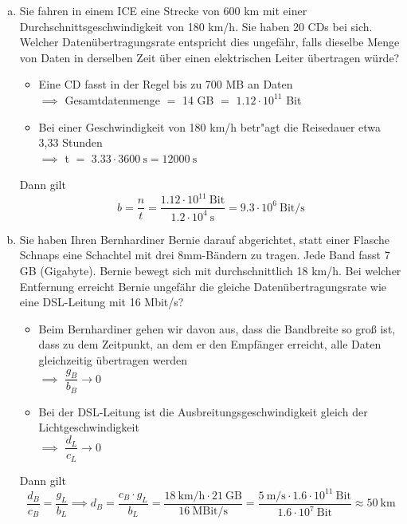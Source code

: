 \begin{enumerate}[(a)]
    \item Sie fahren in einem ICE eine Strecke von 600 km mit einer
        Durchschnittsgeschwindigkeit von 180 km/h. Sie haben 20 CDs bei sich.
        Welcher Datenübertragungsrate entspricht dies ungefähr, falls dieselbe
        Menge von Daten in derselben Zeit über einen elektrischen Leiter
        übertragen würde?
        \begin{itemize}
            \item Eine CD fasst in der Regel bis zu 700 MB an Daten \\
                \tabto{6mm} $\implies$ Gesamtdatenmenge $=$ 14 GB $=$ $1.12 \cdot 10^{11}$ Bit
            \item Bei einer Geschwindigkeit von 180 km/h betr"agt die Reisedauer etwa 3,33 Stunden\\
                \tabto{6mm} $\implies$ t $=$ $3.33 \cdot 3600\ \text{s} = 12000\ \text{s}$
        \end{itemize}
        Dann gilt
        \begin{equation*}
            b = \dfrac{n}{t} = \dfrac{1.12 \cdot 10^{11}\ \text{Bit}}{1.2 \cdot 10^4\ \text{s}} =
                9.3 \cdot 10^6\ \text{Bit/s}
        \end{equation*}
    \item Sie haben Ihren Bernhardiner Bernie darauf abgerichtet, statt einer
        Flasche Schnaps eine Schachtel mit drei 8mm-Bändern zu tragen. Jede
        Band fasst 7 GB (Gigabyte). Bernie bewegt sich mit durchschnittlich 18
        km/h. Bei welcher Entfernung erreicht Bernie ungefähr die gleiche
        Datenübertragungsrate wie eine DSL-Leitung mit 16 Mbit/s?
        \begin{itemize}
            \item Beim Bernhardiner gehen wir davon aus, dass die Bandbreite so
                groß ist, dass zu dem Zeitpunkt, an dem er den Empfänger
                erreicht, alle Daten gleichzeitig übertragen werden \\[10pt]
                \tabto{6mm} $\implies$ $\dfrac{g_B}{b_B} \to 0$
            \item Bei der DSL-Leitung ist die Ausbreitungsgeschwindigkeit gleich der Lichtgeschwindigkeit \\[10pt]
                \tabto{6mm} $\implies$ $\dfrac{d_L}{c_L} \to 0$
       \end{itemize}
       Dann gilt
       \begin{equation*}
           \dfrac{d_B}{c_B} = \dfrac{g_L}{b_L} \implies d_B = \dfrac{c_B \cdot g_L}{b_L} =
           \dfrac{18\ \text{km/h} \cdot 21\ \text{GB}}{16\ \text{MBit/s}} =
           \dfrac{5\ \text{m/s} \cdot 1.6 \cdot 10^{11}\ \text{Bit}}{1.6 \cdot 10^7\ \text{Bit}} \approx 50\ \text{km}
       \end{equation*}
\end{enumerate}
